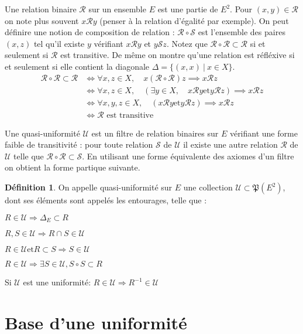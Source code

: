 \documentclass[a4paper, 11pt, french]{book}
\newenvironment{itemise}{\itemize}{\enditemize}
\theoremstyle{plain} %
\theoremstyle{definition} %
\newtheorem{definition}{Définition}
\theoremstyle{remark} %
\newcommand{\1}{\mathds{1}}
\newcommand{\inv}[1]{#1^{-1}}
\newcommand{\et}{\mathrel{\mathrm{et}}}
\renewcommand{\cal}[1]{\mathcal{#1}}
\renewcommand{\frak}[1]{\mathfrak{#1}}
\newcommand{\scr}[1]{\mathscr{#1}}
\newcommand\ens[2]{\{#1 \ |\ #2\}}
\begin{document}
Une relation binaire $\cal{R}$ sur un ensemble $E$ est une partie de $E^2$.
Pour $(x, y)\in\cal{R}$ on note plus souvent $x\cal{R}y$ (penser à la relation d'égalité par exemple).
On peut définire une notion de composition de relation : $\cal{R}\circ\cal{S}$ est l'ensemble des paires $(x, z)$ tel qu'il existe $y$ vérifiant $x\cal{R}y$ et $y\cal{S}z$.
Notez que $\cal{R}\circ\cal{R}\subset\cal{R}$ si et seulement si $\cal{R}$ est transitive.
De même on montre qu'une relation est réfléxive si et seulement si elle contient la diagonale $\Delta=\ens{(x, x)}{x\in X}$.
\begin{align*}
	\cal{R}\circ\cal{R}\subset\cal{R}
	&\iff \forall x, z\in X, \quad x(\cal{R}\circ\cal{R})z\implies x\cal{R}z \\
	&\iff \forall x, z\in X, \quad (\exists y\in X, \quad x\cal{R}y\et y\cal{R}z) \implies x\cal{R}z \\
	&\iff \forall x, y, z\in X, \quad (x\cal{R}y\et y\cal{R}z) \implies x\cal{R}z \\	
	&\iff \text{$\cal{R}$ est transitive}
\end{align*}

Une quasi-uniformité $\scr{U}$ est un filtre de relation binaires sur $E$ vérifiant une forme faible de transitivité :
pour toute relation $\cal{S}$ de $\scr{U}$ il existe une autre relation $\cal{R}$ de $\scr{U}$ telle que $\cal{R}\circ\cal{R}\subset\cal{S}$.
En utilisant une forme équivalente des axiomes d'un filtre on obtient la forme partique suivante.
\begin{definition}
	On appelle quasi-uniformité sur $E$ une collection $\scr{U}\subset\frak{P}(E^2)$, dont ses éléments sont appelés les entourages, telle que :
	\begin{itemise}
		\item $R\in\scr{U}\Rightarrow\Delta_E\subset R$
		\item $R, S\in\scr{U}\Rightarrow R\cap S\in\scr{U}$
		\item $R\in\scr{U}\et R\subset S\Rightarrow S\in\scr{U}$
		\item $R\in\scr{U}\Rightarrow\exists S\in\scr{U}, S\circ S\subset R$
		\item Si $\scr{U}$ est une uniformité: $R\in\scr{U}\Rightarrow\inv{R}\in\scr{U}$
	\end{itemise}
\end{definition}

\section{Base d'une uniformité}
\end{document}
